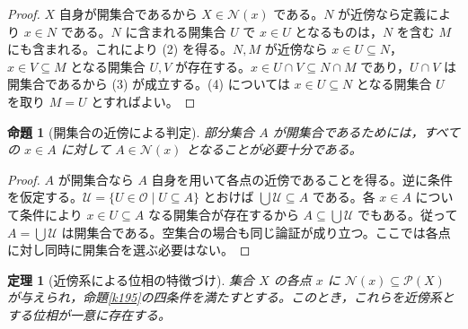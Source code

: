 \documentclass[a5paper,10pt,dvipdfmx]{jsarticle}
\theoremstyle{definition}
\theoremstyle{plain}
\newtheorem{prop}[ruledef]{命題}
\newtheorem{thm}[ruledef]{定理}
\newcommand{\Pow}{\mathcal{P}}
\begin{document}
\begin{proof}
$X$ 自身が開集合であるから $X\in\mathcal N(x)$ である。$N$ が近傍なら定義により $x\in N$ である。$N$ に含まれる開集合 $U$ で $x\in U$ となるものは，$N$ を含む $M$ にも含まれる。これにより (2) を得る。$N,M$ が近傍なら $x\in U\subseteq N$，$x\in V\subseteq M$ となる開集合 $U,V$ が存在する。$x\in U\cap V\subseteq N\cap M$ であり，$U\cap V$ は開集合であるから (3) が成立する。(4) については $x\in U\subseteq N$ となる開集合 $U$ を取り $M=U$ とすればよい。
\end{proof}
\begin{prop}[開集合の近傍による判定]\label{k196}
部分集合 $A$ が開集合であるためには，すべての $x\in A$ に対して $A\in\mathcal N(x)$ となることが必要十分である。
\end{prop}
\begin{proof}
$A$ が開集合なら $A$ 自身を用いて各点の近傍であることを得る。逆に条件を仮定する。$\mathcal U=\{U\in\mathcal O\mid U\subseteq A\}$ とおけば $\bigcup\mathcal U\subseteq A$ である。各 $x\in A$ について条件により $x\in U\subseteq A$ なる開集合が存在するから $A\subseteq\bigcup\mathcal U$ でもある。従って $A=\bigcup\mathcal U$ は開集合である。空集合の場合も同じ論証が成り立つ。ここでは各点に対し同時に開集合を選ぶ必要はない。
\end{proof}
\begin{thm}[近傍系による位相の特徴づけ]\label{k197}
集合 $X$ の各点 $x$ に $\mathcal N(x)\subseteq\Pow(X)$ が与えられ，命題\ref{k195}の四条件を満たすとする。このとき，これらを近傍系とする位相が一意に存在する。
\end{thm}
\end{document}
